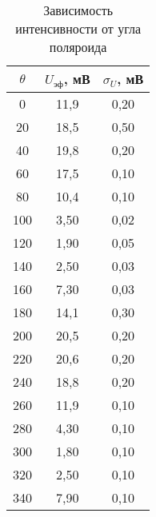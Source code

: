\begin{table}[h!]
    \centering
    \begin{tabular}{|c|c|c|}
    \hline
    $\theta$ & $U_{\text{эф}}$, мВ & $\sigma_U$, мВ \\ \hline
    0        & 11,9                & 0,20           \\ \hline
    20       & 18,5                & 0,50           \\ \hline
    40       & 19,8                & 0,20           \\ \hline
    60       & 17,5                & 0,10           \\ \hline
    80       & 10,4                & 0,10           \\ \hline
    100      & 3,50                & 0,02           \\ \hline
    120      & 1,90                & 0,05           \\ \hline
    140      & 2,50                & 0,03           \\ \hline
    160      & 7,30                & 0,03           \\ \hline
    180      & 14,1                & 0,30           \\ \hline
    200      & 20,5                & 0,20           \\ \hline
    220      & 20,6                & 0,20           \\ \hline
    240      & 18,8                & 0,20           \\ \hline
    260      & 11,9                & 0,10           \\ \hline
    280      & 4,30                & 0,10           \\ \hline
    300      & 1,80                & 0,10           \\ \hline
    320      & 2,50                & 0,10           \\ \hline
    340      & 7,90                & 0,10           \\ \hline
    \end{tabular}
    \caption{Зависимость интенсивности от угла поляроида}
    \label{table:polarisation}
\end{table}